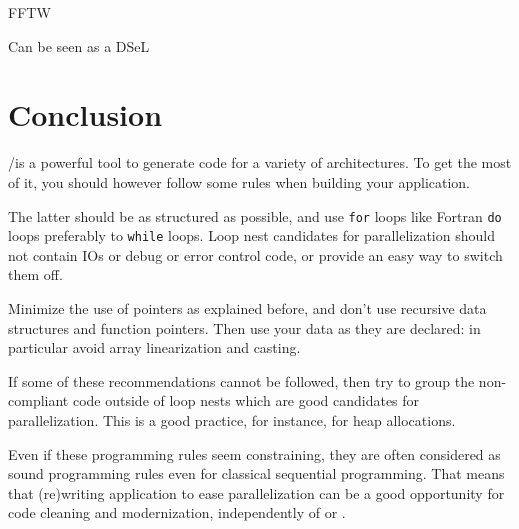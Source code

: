 \documentclass[a4paper]{article}
\begin{document}
FFTW

Can be seen as a DSeL


\section{Conclusion}
\label{sec:conclusion}

\Apips/\Apfa is a powerful tool to generate code for a variety
of architectures. To get the most of it, you should however follow
some rules when building your application.

The latter should be as structured as possible, and use
\lstinline{for} loops like Fortran \lstinline|do| loops preferably to
\lstinline{while} loops. Loop nest candidates for parallelization should
not contain IOs or debug or error control code, or provide an easy way
to switch them off.

Minimize the use of pointers as explained before, and don't use
recursive data structures and function pointers. Then use your data as they are
declared: in particular avoid array linearization and casting.

If some of these recommendations cannot be followed, then try to group
the non-compliant code outside of loop nests which are good
candidates for parallelization.  This is a good practice, for instance,
for heap allocations.

Even if these programming rules seem constraining, they are often
considered as sound programming rules even for classical sequential
programming. That means that (re)writing application to ease
parallelization can be a good opportunity for code cleaning and
modernization, independently of \Apips or \Apfa.


\end{document}
